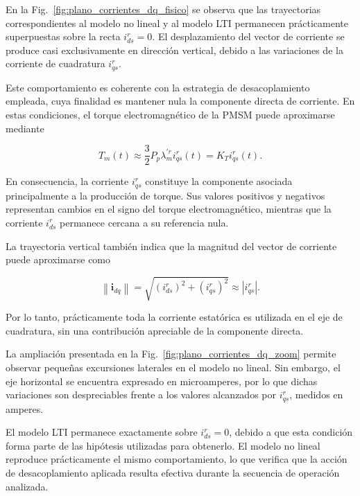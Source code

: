 \documentclass[10pt,a4paper]{article}
\begin{document}
En la Fig.~\ref{fig:plano_corrientes_dq_fisico} se observa que las trayectorias correspondientes al modelo no lineal y al modelo LTI permanecen prácticamente superpuestas sobre la recta \(i_{ds}^{r}=0\). El desplazamiento del vector de corriente se produce casi exclusivamente en dirección vertical, debido a las variaciones de la corriente de cuadratura \(i_{qs}^{r}\).

Este comportamiento es coherente con la estrategia de desacoplamiento empleada, cuya finalidad es mantener nula la componente directa de corriente. En estas condiciones, el torque electromagnético de la PMSM puede aproximarse mediante

\begin{equation}
	T_m(t)
	\approx
	\frac{3}{2}P_p\lambda_m^{\prime r}i_{qs}^{r}(t)
	=
	K_T i_{qs}^{r}(t).
\end{equation}

En consecuencia, la corriente \(i_{qs}^{r}\) constituye la componente asociada principalmente a la producción de torque. Sus valores positivos y negativos representan cambios en el signo del torque electromagnético, mientras que la corriente \(i_{ds}^{r}\) permanece cercana a su referencia nula.

La trayectoria vertical también indica que la magnitud del vector de corriente puede aproximarse como

\begin{equation}
	\left\lVert\mathbf{i}_{dq}\right\rVert
	=
	\sqrt{\left(i_{ds}^{r}\right)^2+
		\left(i_{qs}^{r}\right)^2}
	\approx
	\left|i_{qs}^{r}\right|.
\end{equation}

Por lo tanto, prácticamente toda la corriente estatórica es utilizada en el eje de cuadratura, sin una contribución apreciable de la componente directa.

La ampliación presentada en la Fig.~\ref{fig:plano_corrientes_dq_zoom} permite observar pequeñas excursiones laterales en el modelo no lineal. Sin embargo, el eje horizontal se encuentra expresado en microamperes, por lo que dichas variaciones son despreciables frente a los valores alcanzados por \(i_{qs}^{r}\), medidos en amperes.

El modelo LTI permanece exactamente sobre \(i_{ds}^{r}=0\), debido a que esta condición forma parte de las hipótesis utilizadas para obtenerlo. El modelo no lineal reproduce prácticamente el mismo comportamiento, lo que verifica que la acción de desacoplamiento aplicada resulta efectiva durante la secuencia de operación analizada.
\end{document}
